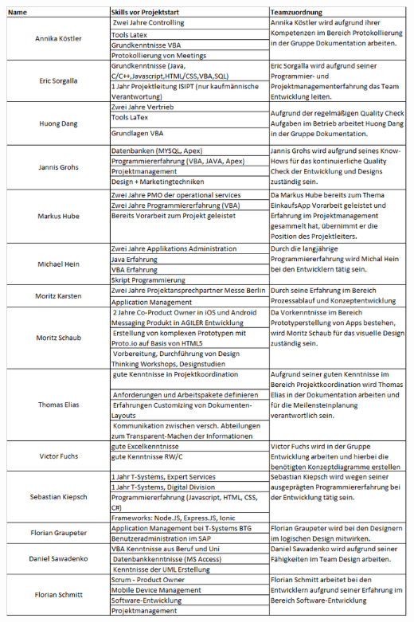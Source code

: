 \documentclass[12pt,a4paper]{article}
\begin{document}
\includegraphics[scale=0.6, origin=l]{Skillliste.png}
\normalsize
\end{document}
